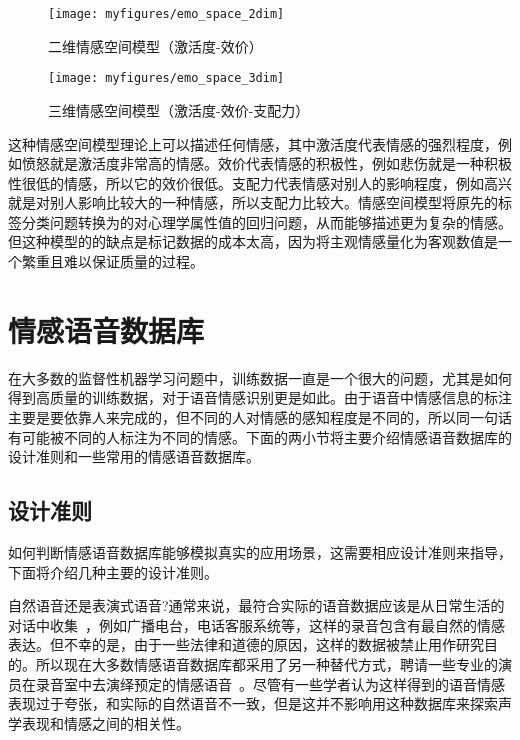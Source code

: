 \begin{figure}[htb] %
    \centering
    \texttt{[image: myfigures/emo\_space\_2dim]}
    \caption{二维情感空间模型（激活度-效价）}
    \label{fig:emo_space_2dim}
\end{figure}

\begin{figure}[htb] %
    \centering
    \texttt{[image: myfigures/emo\_space\_3dim]}
    \caption{三维情感空间模型（激活度-效价-支配力）}
    \label{fig:emo_space_3dim}
\end{figure}

这种情感空间模型理论上可以描述任何情感，其中激活度代表情感的强烈程度，例如愤怒就是激活度非常高的情感。效价代表情感的积极性，例如悲伤就是一种积极性很低的情感，所以它的效价很低。支配力代表情感对别人的影响程度，例如高兴就是对别人影响比较大的一种情感，所以支配力比较大。情感空间模型将原先的标签分类问题转换为的对心理学属性值的回归问题，从而能够描述更为复杂的情感。但这种模型的的缺点是标记数据的成本太高，因为将主观情感量化为客观数值是一个繁重且难以保证质量的过程。

\section{情感语音数据库}
\label{sec:emo_speech_database}
在大多数的监督性机器学习问题中，训练数据一直是一个很大的问题，尤其是如何得到高质量的训练数据，对于语音情感识别更是如此。由于语音中情感信息的标注主要是要依靠人来完成的，但不同的人对情感的感知程度是不同的，所以同一句话有可能被不同的人标注为不同的情感。下面的两小节将主要介绍情感语音数据库的设计准则和一些常用的情感语音数据库。

\subsection{设计准则}
\label{ssec:design_criteria}
如何判断情感语音数据库能够模拟真实的应用场景，这需要相应设计准则来指导，下面将介绍几种主要的设计准则。

自然语音还是表演式语音?通常来说，最符合实际的语音数据应该是从日常生活的对话中收集~\cite{Campbell2000Databases}，例如广播电台，电话客服系统等，这样的录音包含有最自然的情感表达。但不幸的是，由于一些法律和道德的原因，这样的数据被禁止用作研究目的。所以现在大多数情感语音数据库都采用了另一种替代方式，聘请一些专业的演员在录音室中去演绎预定的情感语音~\cite{Mazuka2015Emotions}。尽管有一些学者认为这样得到的语音情感表现过于夸张，和实际的自然语音不一致，但是这并不影响用这种数据库来探索声学表现和情感之间的相关性。

